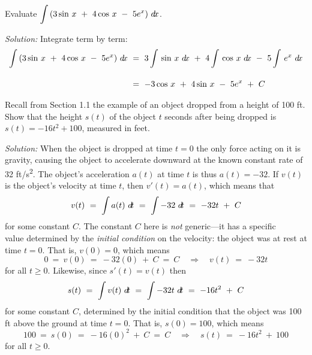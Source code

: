 \newpage
\begin{exmp}\label{antideriv7}
\noindent Evaluate $\displaystyle\int\,(3\sin\,x ~+~ 4\cos\,x ~-~ 5e^x)~d\!x$.\vspace{1mm}
\par\noindent\emph{Solution:} Integrate term by term:
\begin{align*}
\int\,(3\sin\,x ~+~ 4\cos\,x ~-~ 5e^x)~d\!x ~&=~
3\int\,\sin\,x~d\!x ~+~ 4\int\,\cos\,x~d\!x ~-~ 5\int\,e^x~d\!x\\[10pt]
&=~ -3\cos\,x ~+~ 4\sin\,x ~-~ 5e^x ~+~ C
\end{align*}
\end{exmp}
\begin{exmp}\label{exmp:gravity}
\noindent Recall from Section 1.1 the example of an object dropped from a height
of 100 ft. Show that the height $s(t)$ of the object $t$ seconds after being
dropped is $s(t) = -16t^2 + 100$, measured in feet.\vspace{1mm}
\par\noindent\emph{Solution:} When the object is dropped at time $t=0$ the only
force acting on it is gravity, causing the object to accelerate downward at the
known constant rate of 32 ft/s\textsuperscript{2}. The object's acceleration
$a(t)$ at time $t$ is thus $a(t) = -32$. If $v(t)$ is the object's velocity at
time $t$, then $v'(t) = a(t)$, which means that
\[
v(t) ~=~ \int a(t)~d\!t ~=~ \int -32~d\!t ~=~ -32t ~+~ C
\]
for some constant $C$. The constant $C$ here is \emph{not} generic---it has a
specific\\value determined by the \emph{initial condition} on the velocity: the
object was at rest at time $t=0$. That is, $v(0) = 0$, which means
\[
0 ~=~ v(0) ~=~ -32(0) ~+~ C ~=~ C \quad\Rightarrow\quad v(t) ~=~ -32t
\]
for all $t \ge 0$. Likewise, since $s'(t) = v(t)$ then
\[
s(t) ~=~ \int v(t)~d\!t ~=~ \int -32t~d\!t ~=~ -16t^2 ~+~ C
\]
for some constant $C$, determined by the initial condition that the object was 
100 ft above the ground at time $t=0$. That is, $s(0) = 100$, which means
\[
100 ~=~ s(0) ~=~ -16(0)^2 ~+~ C ~=~ C \quad\Rightarrow\quad s(t) ~=~ -16t^2 ~+~ 100
\]
for all $t \ge 0$.\quad\checkmark
\end{exmp}\vspace{-2mm}
\divider
\vspace{2mm}

